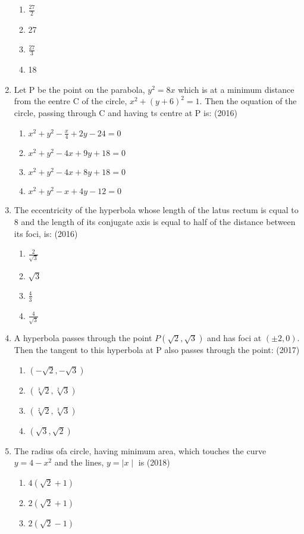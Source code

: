 \documentclass[12pt]{article}
\begin{document}
\begin{enumerate}
\begin{enumerate}
\item $\frac{27}{2}$
\item 27
\item $\frac{27}{3}$
\item 18
\end{enumerate}
\item Let P be the point on the parabola, $y^2=8x$ which is at a minimum distance from the eentre C of the circle, $x^2+(y+6)^2=1$. Then the oquation of the circle, passing through C and having ts centre at P is: (2016)
\begin{enumerate}
\item $x^2+y^2-\frac{x}{4}+2y-24=0$
\item $x^2+y^2-4x+9y+18=0$
\item $x^2+y^2-4x+8y+18=0$
\item $x^2+y^2-x+4y-12=0$
\end{enumerate}
\item The eccentricity of the hyperbola whose length of the latus rectum is cqual to 8 and the length of its conjugate axis is equal to half of the distance between its foci, is: (2016)
\begin{enumerate}
\item $\frac{2}{\sqrt{3}}$
\item $\sqrt{3}$
\item $\frac{4}{3}$
\item $\frac{4}{\sqrt{3}}$
\end{enumerate}
\item A hyperbola passes through the point $P(\sqrt{2},\sqrt{3})$ and has foci at $(\pm 2,0)$. Then the tangent to this hyperbola at P also passes through the point: (2017)
\begin{enumerate}
\item $(-\sqrt{2},-\sqrt{3})$
\item $(\sqrt[3]{2},\sqrt[2]{3})$
\item $(\sqrt[2]{2},\sqrt[3]{3})$
\item $(\sqrt{3},\sqrt{2})$
\end{enumerate}
\item The radius ofa circle, having minimum area, which touches the curve $y=4-x^2$ and the lines, $y=\mid x \mid $ is (2018)
\begin{enumerate}
\item  $4(\sqrt{2}+1)$
\item  $2(\sqrt{2}+1)$
\item  $2(\sqrt{2}-1)$

\end{enumerate}
\end{enumerate}
\end{document}
